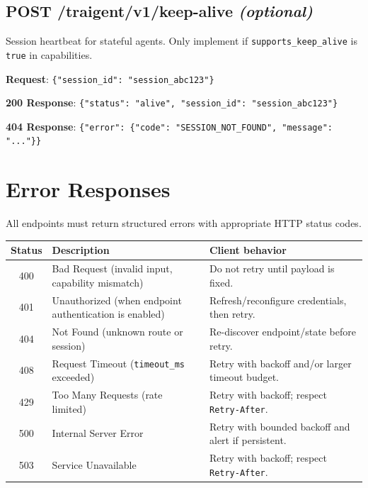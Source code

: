 \documentclass[11pt,a4paper]{article}
\newcommand{\field}[1]{\texttt{#1}}
\begin{document}
\subsection{POST /traigent/v1/keep-alive \normalfont\textit{(optional)}}

Session heartbeat for stateful agents.
Only implement if \field{supports\_keep\_alive} is \texttt{true} in capabilities.

\textbf{Request}: \texttt{\{"session\_id": "session\_abc123"\}}

\textbf{200 Response}: \texttt{\{"status": "alive", "session\_id": "session\_abc123"\}}

\textbf{404 Response}: \texttt{\{"error": \{"code": "SESSION\_NOT\_FOUND", "message": "..."\}\}}

\section{Error Responses}

All endpoints must return structured errors with appropriate HTTP status codes.

\begin{center}\small
\begin{tabularx}{\textwidth}{@{}clX@{}}
\toprule
\textbf{Status} & \textbf{Description} & \textbf{Client behavior} \\
\midrule
400 & Bad Request (invalid input, capability mismatch) & Do not retry until payload is fixed. \\
401 & Unauthorized (when endpoint authentication is enabled) & Refresh/reconfigure credentials, then retry. \\
404 & Not Found (unknown route or session) & Re-discover endpoint/state before retry. \\
408 & Request Timeout (\field{timeout\_ms} exceeded) & Retry with backoff and/or larger timeout budget. \\
429 & Too Many Requests (rate limited) & Retry with backoff; respect \texttt{Retry-After}. \\
500 & Internal Server Error & Retry with bounded backoff and alert if persistent. \\
503 & Service Unavailable & Retry with backoff; respect \texttt{Retry-After}. \\
\bottomrule
\end{tabularx}
\end{center}
\end{document}
